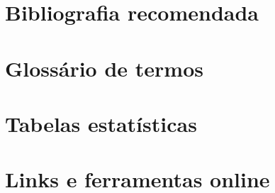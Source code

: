 \documentclass[
]{book}
\begin{document}
\section{Bibliografia recomendada}\label{bibliografia-recomendada}

\section{Glossário de termos}\label{glossuxe1rio-de-termos}

\section{Tabelas estatísticas}\label{tabelas-estatuxedsticas}

\section{Links e ferramentas online}\label{links-e-ferramentas-online}
\end{document}
